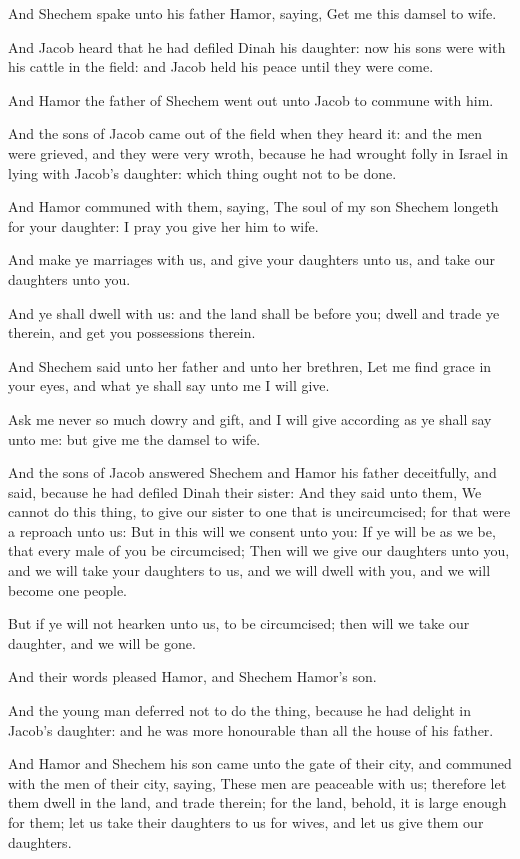 \verse And Shechem spake unto his father Hamor, saying, Get me this damsel to wife.

\verse And Jacob heard that he had defiled Dinah his daughter: now his sons were with his cattle in the field: and Jacob held his peace until they were come.

\verse And Hamor the father of Shechem went out unto Jacob to commune with him.

\verse And the sons of Jacob came out of the field when they heard it: and the men were grieved, and they were very wroth, because he had wrought folly in Israel in lying with Jacob's daughter: which thing ought not to be done.

\verse And Hamor communed with them, saying, The soul of my son Shechem longeth for your daughter: I pray you give her him to wife.

\verse And make ye marriages with us, and give your daughters unto us, and take our daughters unto you.

\verse And ye shall dwell with us: and the land shall be before you; dwell and trade ye therein, and get you possessions therein.

\verse And Shechem said unto her father and unto her brethren, Let me find grace in your eyes, and what ye shall say unto me I will give.

\verse Ask me never so much dowry and gift, and I will give according as ye shall say unto me: but give me the damsel to wife.

\verse And the sons of Jacob answered Shechem and Hamor his father deceitfully, and said, because he had defiled Dinah their sister: \verse And they said unto them, We cannot do this thing, to give our sister to one that is uncircumcised; for that were a reproach unto us: \verse But in this will we consent unto you: If ye will be as we be, that every male of you be circumcised; \verse Then will we give our daughters unto you, and we will take your daughters to us, and we will dwell with you, and we will become one people.

\verse But if ye will not hearken unto us, to be circumcised; then will we take our daughter, and we will be gone.

\verse And their words pleased Hamor, and Shechem Hamor's son.

\verse And the young man deferred not to do the thing, because he had delight in Jacob's daughter: and he was more honourable than all the house of his father.

\verse And Hamor and Shechem his son came unto the gate of their city, and communed with the men of their city, saying, \verse These men are peaceable with us; therefore let them dwell in the land, and trade therein; for the land, behold, it is large enough for them; let us take their daughters to us for wives, and let us give them our daughters.

